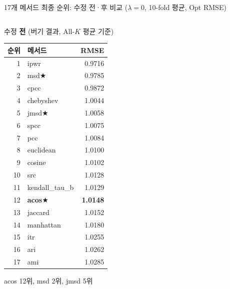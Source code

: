 \documentclass[aspectratio=169,10pt]{beamer}
\begin{document}
\begin{frame}[shrink=8]{17개 메서드 최종 순위: 수정 전·후 비교 \textnormal{\small($\lambda=0$, 10-fold 평균, Opt RMSE)}}
	\begin{columns}[T]
			\begin{block}{수정 \textbf{전} (버기 결과, All-$K$ 평균 기준)}
				\renewcommand{\arraystretch}{1.1}
				\scriptsize
				\begin{tabular}{r|l|r}
					\toprule
					순위 & 메서드 & RMSE \\
					\midrule
					1 & ipwr     & 0.9716 \\
					2 & msd\quad\textcolor{negred}{★} & 0.9785 \\
					3 & cpcc     & 0.9872 \\
					4 & chebyshev & 1.0044 \\
					5 & jmsd\quad\textcolor{negred}{★} & 1.0058 \\
					6 & spcc     & 1.0075 \\
					7 & pcc      & 1.0084 \\
					8 & euclidean & 1.0100 \\
					9 & cosine   & 1.0102 \\
					10 & src     & 1.0128 \\
					11 & kendall\_tau\_b & 1.0129 \\
					\rowcolor{negred!15}
					12 & \textbf{acos}\quad\textcolor{negred}{★} & \textbf{1.0148} \\
					13 & jaccard  & 1.0152 \\
					14 & manhattan & 1.0180 \\
					15 & itr      & 1.0255 \\
					16 & ari      & 1.0262 \\
					17 & ami      & 1.0285 \\
					\bottomrule
				\end{tabular}
				\vspace{0.2em}
				{\tiny acos 12위, msd 2위, jmsd 5위}
			\end{block}


\end{columns}
\end{frame}
\end{document}
